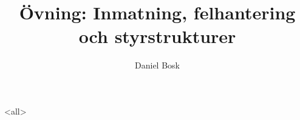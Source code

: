 \documentclass[ignoreframetext]{beamer}
\begin{document}
\title{%
  Övning: Inmatning, felhantering och styrstrukturer
}
\author{Daniel Bosk}

\begin{frame}
  \maketitle
\end{frame}

\mode<all>

\mode*
%
\end{document}
